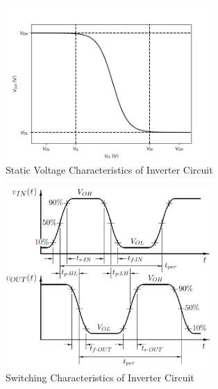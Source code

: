\documentclass[12pt]{../manual}
\begin{document}
\begin{figure}[ht!]
\centering
\includegraphics[width=0.7\textwidth]{staticCharInv.png}
\caption{Static Voltage Characteristics of Inverter Circuit}
\label{fig:static}
\end{figure}

\newpage
\begin{figure}[ht!]
\centering
\includegraphics[width=0.7\textwidth]{switchCharInv.png}
\caption{Switching Characteristics of Inverter Circuit}
\label{fig:switch}
\end{figure}


\newpage
\end{document}
